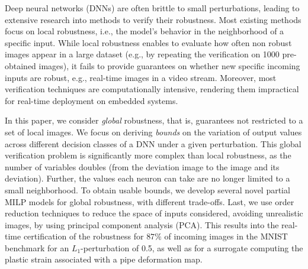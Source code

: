 Deep neural networks (DNNs) are often brittle to small perturbations, leading to extensive research into methods to verify their robustness. Most existing methods focus on local robustness, i.e., the model's behavior in the neighborhood of a specific input. While local robustness enables to evaluate how often non robust images appear in a large dataset (e.g., by repeating the verification on 1000 pre-obtained images), it fails to provide guarantees on whether new specific incoming inputs are robust, e.g., real-time images in a video stream. Moreover, most verification techniques are computationally intensive, rendering them impractical for real-time deployment on embedded systems. 

In this paper, we consider {\em global} robustness, that is, guarantees not restricted to a set of local images. We focus on deriving {\em bounds} on the variation of output values across different decision classes of a DNN under a given perturbation. This global verification problem is significantly more complex than local robustness, as the number of variables doubles (from the deviation image to the image and its deviation). Further, the values each neuron can take are no longer limited to a small neighborhood. To obtain usable bounds, we develop several novel partial MILP models for global robustness, with different trade-offs. Last, we use order reduction techniques to reduce the space of inputs considered, avoiding unrealistic images, by using principal component analysis (PCA). This results into
the real-time  certification of the robustness for $87\%$ of incoming images in the MNIST benchmark for an $L_1$-perturbation of 0.5, as well as for a surrogate computing the
plastic strain associated with a pipe deformation map.